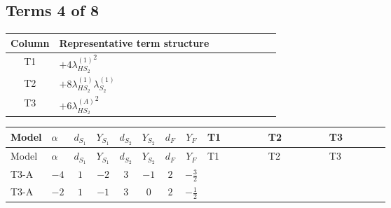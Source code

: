 \documentclass[8pt]{article}
\begin{document}
\begin{landscape}
\subsection*{Terms 4 of 8}
\begin{center}
\begin{tabular}{@{}c >{\raggedright\arraybackslash}p{0.82\linewidth}@{}}
\toprule
Column & Representative term structure \\
\midrule
T1 & \(\displaystyle +4 {\lambda_{HS_2}^{(1)}}^2\) \\
\midrule
T2 & \(\displaystyle +8 {\lambda_{HS_2}^{(1)}} {\lambda_{S_2}^{(1)}}\) \\
\midrule
T3 & \(\displaystyle +6 {\lambda_{HS_2}^{(A)}}^2\) \\
\midrule
\bottomrule
\end{tabular}
\end{center}
\smallskip
\tiny
\begin{longtable}{@{}llcccccc >{\raggedright\arraybackslash}p{0.21\linewidth} >{\raggedright\arraybackslash}p{0.21\linewidth} >{\raggedright\arraybackslash}p{0.21\linewidth}@{}}
\toprule
Model & $\alpha$ & $d_{S_1}$ & $Y_{S_1}$ & $d_{S_2}$ & $Y_{S_2}$ & $d_F$ & $Y_F$ & T1 & T2 & T3 \\
\midrule
\endfirsthead
\toprule
Model & $\alpha$ & $d_{S_1}$ & $Y_{S_1}$ & $d_{S_2}$ & $Y_{S_2}$ & $d_F$ & $Y_F$ & T1 & T2 & T3 \\
\midrule
\endhead
T3-A & $-4$ & $1$ & $-2$ & $3$ & $-1$ & $2$ & $-\frac{3}{2}$ & \scriptsize\adjustbox{max width=\linewidth}{$\begin{gathered} +4 {\lambda_{HS_2}^{(1)}}^2\end{gathered}$} & \scriptsize\adjustbox{max width=\linewidth}{$\begin{gathered} +8 {\lambda_{HS_2}^{(1)}} {\lambda_{S_2}^{(1)}}\end{gathered}$} & \scriptsize\adjustbox{max width=\linewidth}{$\begin{gathered} +6 {\lambda_{HS_2}^{(A)}}^2\end{gathered}$} \\
\midrule
T3-A & $-2$ & $1$ & $-1$ & $3$ & $0$ & $2$ & $-\frac{1}{2}$ & \scriptsize\adjustbox{max width=\linewidth}{$\begin{gathered} +4 {\lambda_{HS_2}^{(1)}}^2\end{gathered}$} & \scriptsize\adjustbox{max width=\linewidth}{$\begin{gathered} +8 {\lambda_{HS_2}^{(1)}} {\lambda_{S_2}^{(1)}}\end{gathered}$} & \scriptsize\adjustbox{max width=\linewidth}{$\begin{gathered} +6 {\lambda_{HS_2}^{(A)}}^2\end{gathered}$} \\

\end{longtable}
\end{landscape}
\end{document}
